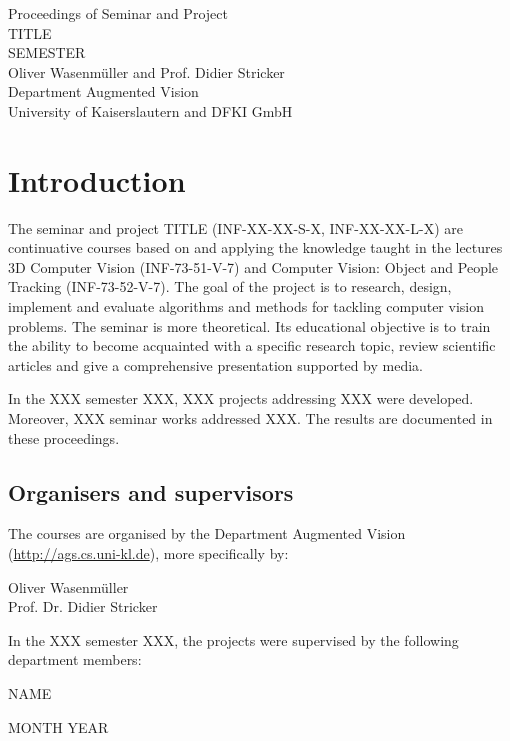 \documentclass{llncs}
\begin{document}
%
\frontmatter          %
%
\pagestyle{headings}  %
%
\begin{titlepage}
\centering
\Large Proceedings of Seminar and Project\\\vspace{1cm} 
\LARGE TITLE\\\vspace{1cm} 
\large SEMESTER\\
\vspace{1cm}
\large Oliver Wasenm\"uller and Prof. Didier Stricker\\

\large Department Augmented Vision\\ University of Kaiserslautern and DFKI GmbH
\end{titlepage}

\chapter*{Introduction}
%
The seminar and project TITLE (INF-XX-XX-S-X, INF-XX-XX-L-X) are continuative courses based on and applying 
the knowledge taught in the lectures 3D Computer Vision (INF-73-51-V-7) and Computer Vision: Object and People Tracking (INF-73-52-V-7). The goal of the project is to research, design, implement and evaluate
algorithms and methods for tackling computer vision problems.
The seminar is more theoretical. Its educational objective is to train the ability to become acquainted 
with a specific research topic, review scientific articles and give a comprehensive presentation supported by media.

In the XXX semester XXX, XXX projects addressing XXX were developed.
Moreover, XXX seminar works addressed XXX.
The results are documented in these proceedings.


\section*{Organisers and supervisors}
The courses are organised by the Department Augmented Vision (\url{http://ags.cs.uni-kl.de}), more specifically by:
\begin{description}
	\item[Oliver Wasenm\"uller]
	\item[Prof. Dr. Didier Stricker] 
\end{description}
In the XXX semester XXX, the projects were supervised by the following department members:
\begin{description}
	\item[NAME]
\end{description}

\vspace{1cm}
\begin{flushright}\noindent
MONTH YEAR
\end{flushright}
%

%
%
\mainmatter              %
%

%
\end{document}
